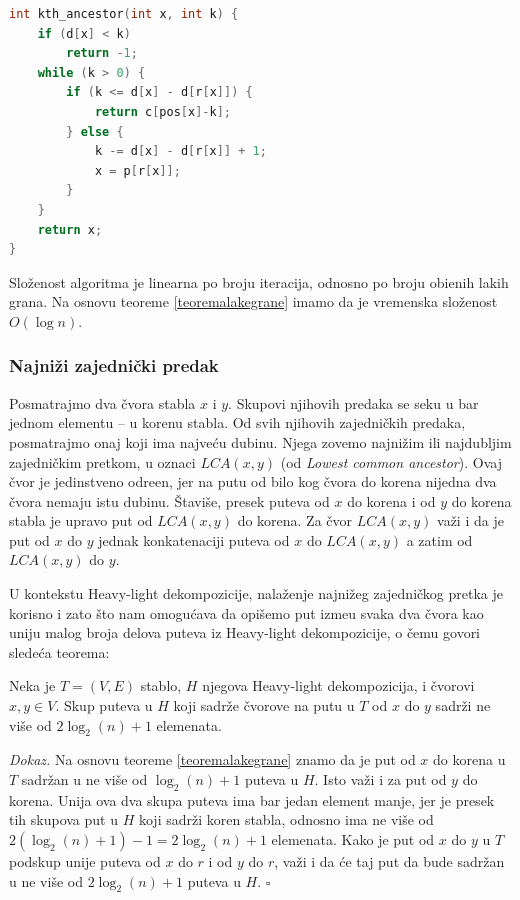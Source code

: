 \noindent
\begin{minipage}{\textwidth}
\begin{lstlisting}[language=C++, title={Implementacija algoritma za nala\v zenje k-tog pretka:}, style=customcpp]
int kth_ancestor(int x, int k) {
	if (d[x] < k)
		return -1;
	while (k > 0) {
		if (k <= d[x] - d[r[x]]) {
			return c[pos[x]-k];
		} else {
			k -= d[x] - d[r[x]] + 1;
			x = p[r[x]];
		}
	}
	return x;
}
\end{lstlisting}
\end{minipage}

Slo\v zenost algoritma je linearna po broju iteracija, odnosno po broju obi\dj enih lakih grana. Na osnovu teoreme \ref{teoremalakegrane} imamo da je vremenska slo\v zenost $O(\log n)$.

\subsubsection{Najni\v zi zajedni\v cki predak}

Posmatrajmo dva \v cvora stabla $x$ i $y$. Skupovi njihovih predaka se seku u bar jednom elementu -- u korenu stabla. Od svih njihovih zajedni\v ckih predaka, posmatrajmo onaj koji ima najve\' cu dubinu. Njega zovemo najni\v zim ili najdubljim zajedni\v ckim pretkom, u oznaci $LCA(x, y)$ (od \textit{Lowest common ancestor}). Ovaj \v cvor je jedinstveno odre\dj en, jer na putu od bilo kog \v cvora do korena nijedna dva \v cvora nemaju istu dubinu. \v Stavi\v se, presek puteva od $x$ do korena i od $y$ do korena stabla je upravo put od $LCA(x, y)$ do korena. Za \v cvor $LCA(x,y)$ va\v zi i da je put od $x$ do $y$ jednak konkatenaciji puteva od $x$ do $LCA(x,y)$ a zatim od $LCA(x,y)$ do $y$.

U kontekstu Heavy-light dekompozicije, nala\v zenje najni\v zeg zajedni\v ckog pretka je korisno i zato \v sto nam omogu\' cava da opi\v semo put izme\dj u svaka dva \v cvora kao uniju malog broja delova puteva iz Heavy-light dekompozicije, o \v cemu govori slede\' ca teorema:

\begin{thm}
\label{dveajkule}
Neka je $T = (V,E)$ stablo, $H$ njegova Heavy-light dekompozicija, i \v cvorovi $x,y \in V$. Skup puteva u $H$ koji sadr\v ze \v cvorove na putu u $T$ od $x$ do $y$ sadr\v zi ne vi\v se od $2\log_2(n)+1$ elemenata.
\end{thm}

\textit{Dokaz.} Na osnovu teoreme \ref{teoremalakegrane} znamo da je put od $x$ do korena u $T$ sadr\v zan u ne vi\v se od $\log_2(n)+1$ puteva u $H$. Isto va\v zi i za put od $y$ do korena. Unija ova dva skupa puteva ima bar jedan element manje, jer je presek tih skupova put u $H$ koji sadr\v zi koren stabla, odnosno ima ne vi\v se od $2(\log_2(n)+1) - 1 = 2\log_2(n)+1$ elemenata. Kako je put od $x$ do $y$ u $T$ podskup unije puteva od $x$ do $r$ i od $y$ do $r$, va\v zi i da \' ce taj put da bude sadr\v zan u ne vi\v se od $2\log_2(n)+1$ puteva u $H$. \hfill $\square$

